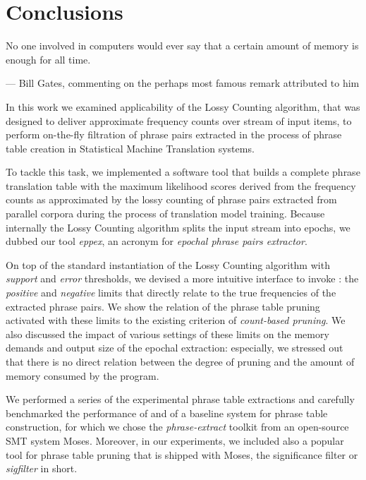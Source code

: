 \chapter{Conclusions}
\label{chap:conclusions}

\setlength{\epigraphwidth}{1.0\textwidth}
\epigraph{No one involved in computers would ever say that a certain amount of memory is enough for all time.}{--- Bill Gates, commenting on the perhaps most famous remark attributed to him}

In this work we examined applicability of the Lossy Counting algorithm,
that was designed to deliver approximate frequency counts over stream of
input items, to perform on-the-fly filtration of phrase pairs extracted in
the process of phrase table creation in Statistical Machine Translation systems.

To tackle this task, we implemented a software tool that builds a complete phrase
translation table with the maximum likelihood scores derived from the frequency
counts as approximated by the lossy counting of phrase pairs extracted from
parallel corpora during the process of translation model training.
Because internally the Lossy Counting algorithm splits the input stream into
epochs, we dubbed our tool \emph{eppex}, an acronym for \emph{epochal phrase
pairs extractor}.

On top of the standard instantiation of the Lossy Counting algorithm with
\emph{support} and \emph{error} thresholds, we devised a more intuitive interface
to invoke \eppex{}: the \emph{positive} and \emph{negative} limits that
directly relate to the true frequencies of the extracted phrase pairs.
We show the relation of the phrase table pruning activated with these limits
to the existing criterion of \emph{count-based pruning}.
We also discussed the impact of various settings of these limits on the memory
demands and output size of the epochal extraction: especially, we stressed out
that there is no direct relation between the degree of pruning and the amount
of memory consumed by the program.

We performed a series of the experimental phrase table extractions and carefully
benchmarked the performance of \eppex{} and of a baseline system for phrase
table construction, for which we chose the \emph{phrase-extract} toolkit from
an open-source SMT system Moses.
Moreover, in our experiments, we included also a popular tool for phrase table
pruning that is shipped with Moses, the significance filter or \emph{sigfilter}
in short.

